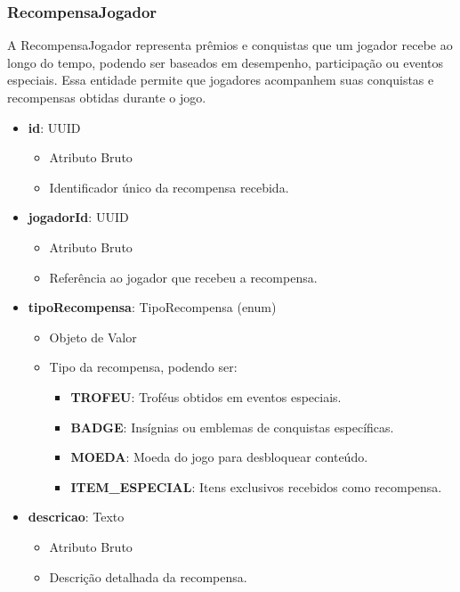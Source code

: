     \subsubsection{RecompensaJogador}
    A RecompensaJogador representa prêmios e conquistas que um jogador recebe ao longo do tempo, podendo ser baseados em desempenho, participação ou eventos especiais. Essa entidade permite que jogadores acompanhem suas conquistas e recompensas obtidas durante o jogo.
    \begin{itemize}
        \item \textbf{id}: UUID  
              \begin{itemize}
                  \item Atributo Bruto
                  \item Identificador único da recompensa recebida.
              \end{itemize}
    
        \item \textbf{jogadorId}: UUID  
              \begin{itemize}
                  \item Atributo Bruto
                  \item Referência ao jogador que recebeu a recompensa.
              \end{itemize}
    
        \item \textbf{tipoRecompensa}: TipoRecompensa (enum)  
              \begin{itemize}
                  \item Objeto de Valor
                  \item Tipo da recompensa, podendo ser:
                  \begin{itemize}
                      \item \textbf{TROFEU}: Troféus obtidos em eventos especiais.
                      \item \textbf{BADGE}: Insígnias ou emblemas de conquistas específicas.
                      \item \textbf{MOEDA}: Moeda do jogo para desbloquear conteúdo.
                      \item \textbf{ITEM\_ESPECIAL}: Itens exclusivos recebidos como recompensa.
                  \end{itemize}
              \end{itemize}
    
        \item \textbf{descricao}: Texto  
              \begin{itemize}
                  \item Atributo Bruto
                  \item Descrição detalhada da recompensa.
              \end{itemize}
    

\end{itemize}
